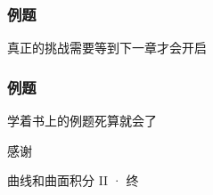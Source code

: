 \documentclass[xetex]{beamer}
\begin{document}
    \begin{frame}
        \frametitle{例题}
        \centering
        真正的挑战需要等到下一章才会开启
    
    \end{frame}

    \begin{frame}
        \frametitle{例题}
        \centering
        学着书上的例题死算就会了
    
    \end{frame}

    \begin{frame}[standout]
    
        感谢

        \small{曲线和曲面积分 II · 终}
    
    \end{frame}
\end{document}

